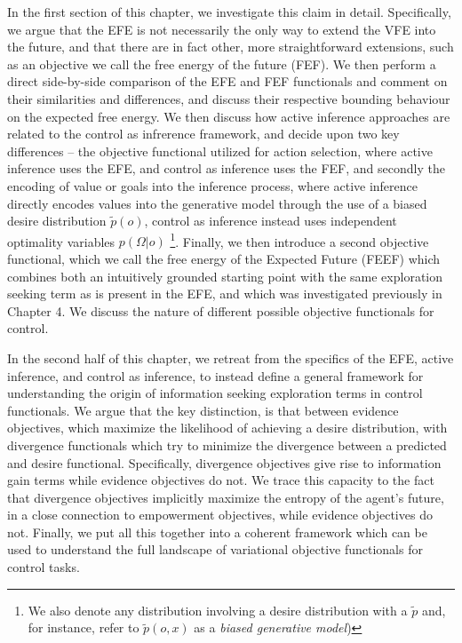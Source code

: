 In the first section of this chapter, we investigate this claim in detail. Specifically, we argue that the EFE is not necessarily the only way to extend the VFE into the future, and that there are in fact other, more straightforward extensions, such as an objective we call the free energy of the future (FEF). We then perform a direct side-by-side comparison of the EFE and FEF functionals and comment on their similarities and differences, and discuss their respective bounding behaviour on the expected free energy. We then discuss how active inference approaches are related to the control as infrerence framework, and decide upon two key differences -- the objective functional utilized for action selection, where active inference uses the EFE, and control as inference uses the FEF, and secondly the encoding of value or goals into the inference process, where active inference directly encodes values into the generative model through the use of a biased desire distribution $\tilde{p}(o)$, control as inference instead uses independent optimality variables $p(\Omega | o)$ \footnote{We also denote any distribution involving a desire distribution with a $\tilde{p}$ and, for instance, refer to $\tilde{p}(o,x)$ as a \emph{biased generative model})}. Finally, we then introduce a second objective functional, which we call the free energy of the Expected Future (FEEF) which combines both an intuitively grounded starting point with the same exploration seeking term as is present in the EFE, and which was investigated previously in Chapter 4. We discuss the nature of different possible objective functionals for control.

In the second half of this chapter, we retreat from the specifics of the EFE, active inference, and control as inference, to instead define a general framework for understanding the origin of information seeking exploration terms in control functionals. We argue that the key distinction, is that between evidence objectives, which maximize the likelihood of achieving a desire distribution, with divergence functionals which try to minimize the divergence between a predicted and desire functional. Specifically, divergence objectives give rise to information gain terms while evidence objectives do not. We trace this capacity to the fact that divergence objectives implicitly maximize the entropy of the agent's future, in a close connection to empowerment objectives, while evidence objectives do not. Finally, we put all this together into a coherent framework which can be used to understand the full landscape of variational objective functionals for control tasks.

